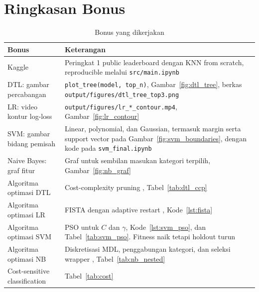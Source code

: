 \section{Ringkasan Bonus}
\begin{table}[H]
\centering
\caption{Bonus yang dikerjakan}
\label{tab:bonus}
\begin{tabularx}{\textwidth}{>{\raggedright\arraybackslash}p{4.2cm}X}
\toprule
Bonus & Keterangan \\
\midrule
Kaggle & Peringkat 1 public leaderboard dengan KNN from scratch, reproducible melalui \texttt{src/main.ipynb} \\
DTL: gambar percabangan & \texttt{plot\_tree(model, top\_n)}, Gambar~\ref{fig:dtl_tree}, berkas \texttt{output/figures/dtl\_tree\_top3.png} \\
LR: video kontur log-loss & \texttt{output/figures/lr\_*\_contour.mp4}, Gambar~\ref{fig:lr_contour} \\
SVM: gambar bidang pemisah & Linear, polynomial, dan Gaussian, termasuk margin serta support vector pada Gambar~\ref{fig:svm_boundaries}, dengan kode pada \texttt{svm\_final.ipynb} \\
Naive Bayes: graf fitur & Graf untuk sembilan masukan kategori terpilih, Gambar~\ref{fig:nb_graf} \\
Algoritma optimasi DTL & Cost-complexity pruning \cite{ref:breiman}, Tabel~\ref{tab:dtl_ccp} \\
Algoritma optimasi LR & FISTA dengan adaptive restart \cite{ref:fista}, Kode~\ref{lst:fista} \\
Algoritma optimasi SVM & PSO untuk $C$ dan $\gamma$, Kode~\ref{lst:svm_pso}, dan Tabel~\ref{tab:svm_pso}. Fitness naik tetapi holdout turun \cite{ref:pso,ref:pso_shi} \\
Algoritma optimasi NB & Diskretisasi MDL, penggabungan kategori, dan seleksi wrapper \cite{ref:fayyad_nb,ref:pazzani_nb,ref:kohavi_nb}, Tabel~\ref{tab:nb_nested} \\
Cost-sensitive classification & Tabel~\ref{tab:cost} \\
\bottomrule
\end{tabularx}
\end{table}
